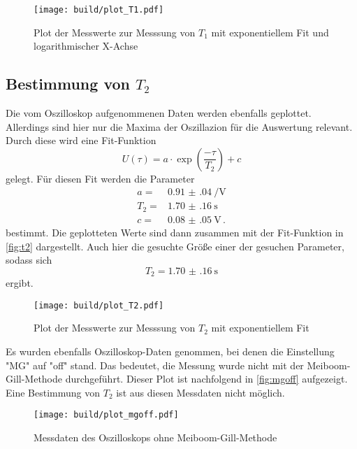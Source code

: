 \begin{figure}
    \centering
    \texttt{[image: build/plot\_T1.pdf]}
    \caption{Plot der Messwerte zur Messsung von $T_1$ mit exponentiellem Fit und logarithmischer X-Achse}
    \label{fig:t1}
\end{figure}

\subsection{Bestimmung von $T_2$}
\label{ssec:aus2}

Die vom Oszilloskop aufgenommenen Daten werden ebenfalls geplottet.
Allerdings sind hier nur die Maxima der Oszillazion für die Auswertung relevant.
Durch diese wird eine Fit-Funktion 
\begin{equation}
    U(\tau) = a \cdot \exp(\frac{- \tau}{T_2}) + c 
    \label{eq:fit_t2}
\end{equation}
gelegt.
Für diesen Fit werden die Parameter 
\begin{align*}
    a =& \SI{0.91(04)}{\per\volt} \\
    T_2 =& \SI{1.70(16)}{\second} \\
    c =& \SI{0.08(05)}{\volt} \, .
\end{align*}
bestimmt.
Die geplotteten Werte sind dann zusammen mit der Fit-Funktion in \autoref{fig:t2} dargestellt.
Auch hier die gesuchte Größe einer der gesuchen Parameter, sodass sich 
\begin{equation}
    T_2 = \SI{1.70(16)}{\second} 
    \label{eq:t2_wert}
\end{equation}
ergibt.
\begin{figure}
    \centering
    \texttt{[image: build/plot\_T2.pdf]}
    \caption{Plot der Messwerte zur Messsung von $T_2$ mit exponentiellem Fit}
    \label{fig:t2}
\end{figure}

Es wurden ebenfalls Oszilloskop-Daten genommen, bei denen die Einstellung "MG" auf "off" stand.
Das bedeutet, die Messung wurde nicht mit der Meiboom-Gill-Methode durchgeführt.
Dieser Plot ist nachfolgend in \autoref{fig:mgoff} aufgezeigt.
Eine Bestimmung von $T_2$ ist aus diesen Messdaten nicht möglich.

\begin{figure}
    \centering
    \texttt{[image: build/plot\_mgoff.pdf]}
    \caption{Messdaten des Oszilloskops ohne Meiboom-Gill-Methode}
    \label{fig:mgoff}
\end{figure}

